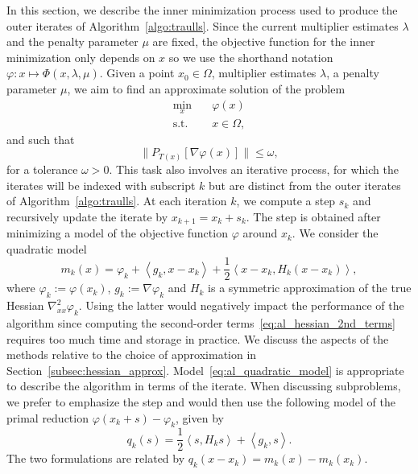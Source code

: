 \documentclass{article}
\numberwithin{equation}{section}
\newcommand{\inner}[2]{\left\langle {#1} , {#2} \right\rangle} %
\newcommand{\proj}[2]{P_{#1} \left[ {#2} \right]} %
\theoremstyle{plain}
\begin{document}
	In this section, we describe the inner minimization process used to produce the outer iterates of Algorithm~\ref{algo:traulls}.
	Since the current multiplier estimates $\lambda$ and the penalty parameter $\mu$ are fixed, the objective function for the inner minimization only depends on $x$ so we use the shorthand notation $\varphi : x\mapsto \Phi(x,\lambda,\mu)$.
	Given a point $x_0 \in \Omega$, multiplier estimates $\lambda$, a penalty parameter $\mu$, we aim to find an approximate solution of the problem
	\begin{equation}\label{eq:inner_itr_subpb}
		\begin{aligned}
			\min_x \quad & \varphi(x)\\
			\text{s.t.} \quad & x \in \Omega,
		\end{aligned}
	\end{equation}
	and such that
	\begin{equation*}
		\|\proj{T(x)}{\nabla \varphi(x)}\| \le \omega,
	\end{equation*}
	for a tolerance $\omega > 0$. This task also involves an iterative process, for which the iterates will be indexed with subscript $k$ but are distinct from the outer iterates of Algorithm~\ref{algo:traulls}. At each iteration $k$, we compute a step $s_k$ and recursively update the iterate by $x_{k+1}=x_k+s_k$. The step is obtained after minimizing a model of the objective function $\varphi$ around $x_k$. We consider the quadratic model
	\begin{equation}\label{eq:al_quadratic_model}
		m_k(x) = \varphi_k + \inner{g_k}{x-x_k} + \dfrac{1}{2}\inner{x-x_k}{H_k(x-x_k)},
	\end{equation}
	where $\varphi_k:=\varphi(x_k)$, $g_k:=\nabla \varphi_k$ and $H_k$ is a symmetric approximation of the true Hessian $\nabla^2_{xx} \varphi_k$. Using the latter would negatively impact the performance of the algorithm since computing the second-order terms~\eqref{eq:al_hessian_2nd_terms} requires too much time and storage in practice. We discuss the aspects of the methods relative to the choice of approximation in Section~\ref{subsec:hessian_approx}. 
	Model~\eqref{eq:al_quadratic_model} is appropriate to describe the algorithm in terms of the iterate. When discussing subproblems, we prefer to emphasize the step and would then use the following model of the primal reduction $\varphi(x_k+s)-\varphi_k$, given by
	\begin{equation*}
		q_k(s) = \dfrac{1}{2}\inner{s}{H_ks} + \inner{g_k}{s}.
	\end{equation*}
	The two formulations are related by $q_k(x-x_k)=m_k(x)-m_k(x_k)$.
	
\end{document}
